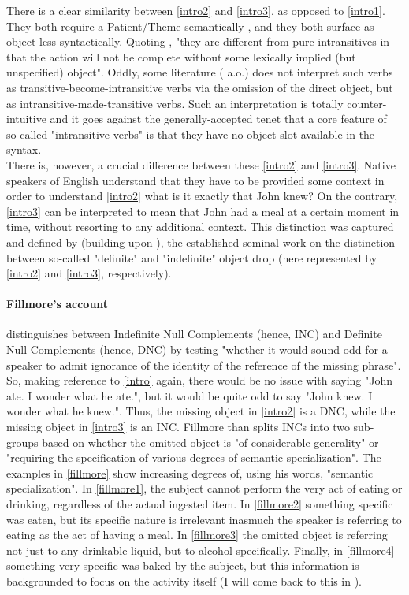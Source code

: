There is a clear similarity between \ref{intro2} and \ref{intro3}, as opposed to \ref{intro1}. They both require a Patient/Theme semantically \parencite[510]{Somers1984}, and they both surface as object-less syntactically. Quoting \textcite[48]{Yasutake1987}, "they are different from pure intransitives in that the action will not be complete without some lexically implied (but unspecified) object". Oddly, some literature (\textcite{BourmayanRecanati2013} a.o.) does not interpret such verbs as transitive-become-intransitive verbs via the omission of the direct object, but as intransitive-made-transitive verbs. Such an interpretation is totally counter-intuitive and it goes against the generally-accepted tenet that a core feature of so-called "intransitive verbs" is that they have no object slot available in the syntax.\\
There is, however, a crucial difference between these \ref{intro2} and \ref{intro3}. Native speakers of English understand that they have to be provided some context in order to understand \ref{intro2} \textemdash what is it exactly that John knew? On the contrary, \ref{intro3} can be interpreted to mean that John had a meal at a certain moment in time, without resorting to any additional context. This distinction was captured and defined by \textcite{Fillmore1986} (building upon \textcite{fillmore1969types, Allerton1975}), the established seminal work on the distinction between so-called "definite" and "indefinite" object drop (here represented by \ref{intro2} and \ref{intro3}, respectively).

\paragraph{Fillmore's account}
\textcite[96]{Fillmore1986} distinguishes between Indefinite Null Complements (hence, INC) and Definite Null Complements (hence, DNC) by testing "whether it would sound odd for a speaker to admit ignorance of the identity of the reference of the missing phrase". So, making reference to \ref{intro} again, there would be no issue with saying "John ate. I wonder what he ate.", but it would be quite odd to say "John knew. I wonder what he knew.". Thus, the missing object in \ref{intro2} is a DNC, while the missing object in \ref{intro3} is an INC. Fillmore than splits INCs into two sub-groups based on whether the omitted object is "of considerable generality" or "requiring the specification of various degrees of semantic specialization". The examples in \ref{fillmore} \parencite[96-97]{Fillmore1986} show increasing degrees of, using his words, "semantic specialization". In \ref{fillmore1}, the subject cannot perform the very act of eating or drinking, regardless of the actual ingested item. In \ref{fillmore2} something specific was eaten, but its specific nature is irrelevant inasmuch the speaker is referring to eating as the act of having a meal. In \ref{fillmore3} the omitted object is referring not just to any drinkable liquid, but to alcohol specifically. Finally, in \ref{fillmore4} something very specific was baked by the subject, but this information is backgrounded to focus on the activity itself (I will come back to this in ).

